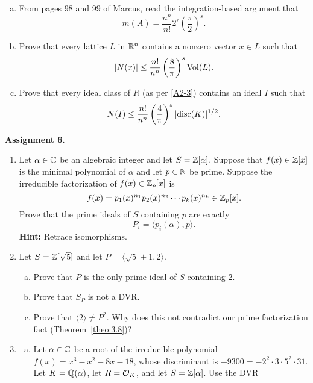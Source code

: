 \begin{enumerate}[leftmargin=1.5cm, label={{\bf A5-\arabic*}}]
\begin{enumerate}[(a)]
        \item From pages 98 and 99 of Marcus, read the integration-based argument that 
        \[ m(A) = \frac{n^n}{n!} 2^r \left( \frac{\pi}{2} \right)^s. \] 
        \item Prove that every lattice $L$ in $\mathbb{R}^n$ contains a nonzero vector $x \in L$ 
        such that 
        \[ |N(x)| \leq \frac{n!}{n^n} \left( \frac{8}{\pi} \right)^s \operatorname{Vol}(L). \] 
        \item Prove that every ideal class of $R$ (as per \ref{A2-3}) contains 
        an ideal $I$ such that 
        \[ N(I) \leq \frac{n!}{n^n} \left( \frac{4}{\pi} \right)^s \lvert\operatorname{disc}(K)\rvert^{1/2}. \] 
    \end{enumerate} 
\end{enumerate}

{\bf Assignment 6.} 
\begin{enumerate}[leftmargin=1.5cm, label={{\bf A6-\arabic*}}]
    \item \label{A6-1} Let $\alpha \in \mathbb{C}$ be an algebraic integer and let 
    $S = \mathbb{Z}[\alpha]$. Suppose that $f(x) \in \mathbb{Z}[x]$ is the minimal polynomial of 
    $\alpha$ and let $p \in \mathbb{N}$ be prime. Suppose the irreducible 
    factorization of $f(x) \in \mathbb{Z}_p[x]$ is 
    \[ f(x) = p_1(x)^{n_1} p_2(x)^{n_2} \cdots p_k(x)^{n_k} \in \mathbb{Z}_p[x]. \] 
    Prove that the prime ideals of $S$ containing $p$ are exactly 
    \[ P_i = \langle p_i(\alpha), p \rangle. \] 
    {\bf Hint:} Retrace isomorphisms. 
    \item \label{A6-2} Let $S = \mathbb{Z}[\sqrt{5}]$ and let $P = \langle \sqrt{5}+1, 2 \rangle$. 
    \begin{enumerate}[(a)]
        \item Prove that $P$ is the only prime ideal of $S$ containing $2$. 
        \item Prove that $S_P$ is not a DVR. 
        \item Prove that $\langle 2 \rangle \neq P^2$. Why does this not 
        contradict our prime factorization fact (Theorem~\ref{theo:3.8})?
    \end{enumerate}
    \item \label{A6-3} \begin{enumerate}[(a)]
        \item Let $\alpha \in \mathbb{C}$ be a root of the irreducible polynomial 
        $f(x) = x^3 - x^2 - 8x - 18$, whose discriminant is 
        $-9300 = -2^2 \cdot 3 \cdot 5^2 \cdot 31$. Let $K = \mathbb{Q}(\alpha)$, 
        let $R = {\cal O}_K$, and let $S = \mathbb{Z}[\alpha]$. Use the DVR 

\end{enumerate}
\end{enumerate}

